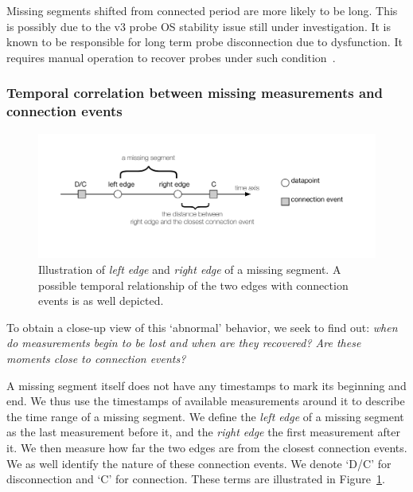 Missing segments shifted from connected period are more likely to be long. This is possibly due to the v3 probe OS stability issue still under investigation. It is known to be responsible for long term probe disconnection due to dysfunction.
It requires manual operation to recover probes under such condition~\cite{usb, 1look, 2look, 3look}.


\subsubsection{Temporal correlation between missing measurements and connection events}
\begin{figure}[!htb]
\centering
\includegraphics[width=\textwidth]{gfx/chap3/miss_seg_ill.pdf}
\caption{Illustration of \textit{left edge} and \textit{right edge} of a missing segment. A possible temporal relationship of the two edges with connection events is as well depicted.}
\label{fig:miss_seg_ill}
\end{figure}

To obtain a close-up view of this `abnormal' behavior, we seek to find out: \textit{when do measurements begin to be lost and when are they recovered? Are these moments close to connection events?}

A missing segment itself does not have any timestamps to mark its beginning and end.
We thus use the timestamps of available measurements around it to describe the time range of a missing segment.
We define the \textit{left edge} of a missing segment as the last measurement before it, and the \textit{right edge} the first measurement after it.
We then measure how far the two edges are from the closest connection events.
We as well identify the nature of these connection events.
We denote `D/C' for disconnection and `C' for connection. 
These terms are illustrated in Figure~\ref{fig:miss_seg_ill}.

